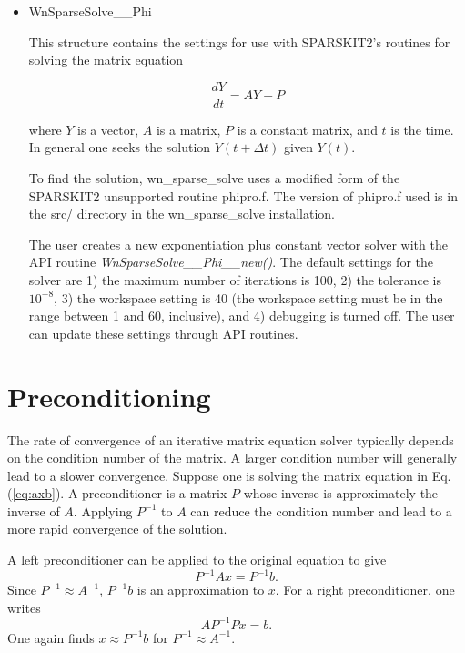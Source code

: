 \documentclass{article}    %
\begin{document}
\begin{itemize}
\item WnSparseSolve\_\_Phi

This structure contains the settings for use with SPARSKIT2's routines for
solving the matrix equation

\begin{equation}
\frac{dY}{dt} = AY + P
\label{eq:phi_dydt}
\end{equation}

where $Y$ is a vector, $A$ is a matrix, $P$ is a constant matrix,
and $t$ is the time.  In general
one seeks the solution $Y(t + \Delta t)$ given $Y(t)$.

To find the solution, wn\_sparse\_solve uses a modified form of the
SPARSKIT2 unsupported routine phipro.f.  The version of phipro.f used
is in the src/ directory in the wn\_sparse\_solve installation.

The user creates a new exponentiation plus constant vector
solver with the API routine
{\em WnSparseSolve\_\_Phi\_\_new()}.  The default settings for the solver
are 1) the maximum number of iterations is 100, 2) the tolerance is 
$10^{-8}$, 3) the workspace setting is 40 (the workspace setting must be 
in the range between 1 and 60, inclusive), and 4) debugging is turned off.
The user can update these settings through API routines.

\end{itemize}

\section{Preconditioning}

The rate of convergence of an iterative matrix equation solver typically
depends on the condition number of the matrix.  A larger condition number
will generally lead to a slower convergence.  Suppose one is solving the matrix
equation in Eq. (\ref{eq:axb}).  A preconditioner is a matrix $P$ whose inverse
is approximately the inverse of $A$.  Applying $P^{-1}$ to $A$ can reduce
the condition number and lead to a more rapid convergence of the solution.

A left preconditioner can be applied to the original equation to give
\begin{equation}
P^{-1} A x = P^{-1} b.
\label{eq:pre_left}
\end{equation}
Since $P^{-1} \approx A^{-1}$, $P^{-1} b$ is an approximation to $x$.  For
a right preconditioner, one writes
\begin{equation}
AP^{-1}P x = b.
\label{eq:pre_right}
\end{equation}
One again finds $x \approx P^{-1} b$ for $P^{-1} \approx A^{-1}$.
\end{document}
